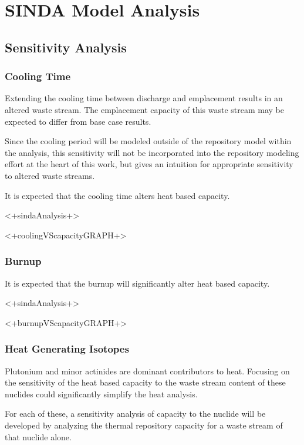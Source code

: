 \section{SINDA Model Analysis}
\subsection{Sensitivity Analysis}
\subsubsection{Cooling Time}

Extending the cooling time between discharge and emplacement results
in an altered waste stream. The emplacement capacity
of this waste stream may be expected to differ from base case results. 

Since the cooling period will be modeled outside of the repository model within  
the \Cyclus analysis, this sensitivity will not be incorporated into the 
repository modeling effort at the heart of this work, but gives an intuition for 
appropriate sensitivity to altered waste streams.

It is expected that the cooling time alters heat based capacity. 

<+sindaAnalysis+>

<+coolingVScapacityGRAPH+>

\subsubsection{Burnup}

It is expected that the burnup will significantly alter heat based capacity. 

<+sindaAnalysis+>

<+burnupVScapacityGRAPH+>

\subsubsection{Heat Generating Isotopes}

Plutonium and minor actinides are dominant contributors to heat. Focusing on
the sensitivity of the heat based capacity to the waste stream content of 
these nuclides could significantly simplify the heat analysis. 
 
For each of these, a sensitivity analysis of capacity to the nuclide will be 
developed by analyzing the thermal repository capacity for a waste stream of 
that nuclide alone.  


